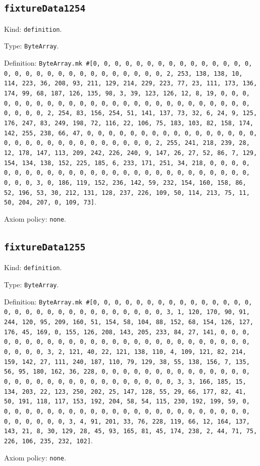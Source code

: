 \documentclass[11pt]{article}
\begin{document}
\subsection*{\texttt{fixtureData1254}}
\noindent Kind: \texttt{definition}.\par
\noindent Type: \texttt{ByteArray}.\par
\noindent Definition: \texttt{ByteArray.mk \#[0, 0, 0, 0, 0, 0, 0, 0, 0, 0, 0, 0, 0, 0, 0, 0, 0, 0, 0, 0, 0, 0, 0, 0, 0, 0, 0, 0, 0, 0, 2, 253, 138, 138, 10, 114, 223, 36, 208, 93, 211, 129, 214, 229, 223, 77, 23, 111, 173, 136, 174, 99, 68, 187, 126, 135, 98, 3, 39, 123, 126, 12, 8, 19, 0, 0, 0, 0, 0, 0, 0, 0, 0, 0, 0, 0, 0, 0, 0, 0, 0, 0, 0, 0, 0, 0, 0, 0, 0, 0, 0, 0, 0, 0, 2, 254, 83, 156, 254, 51, 141, 137, 73, 32, 6, 24, 9, 125, 176, 247, 83, 249, 198, 72, 116, 22, 106, 75, 183, 103, 82, 158, 174, 142, 255, 238, 66, 47, 0, 0, 0, 0, 0, 0, 0, 0, 0, 0, 0, 0, 0, 0, 0, 0, 0, 0, 0, 0, 0, 0, 0, 0, 0, 0, 0, 0, 0, 0, 2, 255, 241, 218, 239, 28, 12, 178, 147, 113, 209, 242, 226, 240, 9, 147, 26, 27, 52, 86, 7, 129, 154, 134, 138, 152, 225, 185, 6, 233, 171, 251, 34, 218, 0, 0, 0, 0, 0, 0, 0, 0, 0, 0, 0, 0, 0, 0, 0, 0, 0, 0, 0, 0, 0, 0, 0, 0, 0, 0, 0, 0, 0, 0, 3, 0, 186, 119, 152, 236, 142, 59, 232, 154, 160, 158, 86, 52, 196, 53, 30, 212, 131, 128, 237, 226, 109, 50, 114, 213, 75, 11, 50, 204, 207, 0, 109, 73]}.\par
\noindent Axiom policy: \texttt{none}.\par
\subsection*{\texttt{fixtureData1255}}
\noindent Kind: \texttt{definition}.\par
\noindent Type: \texttt{ByteArray}.\par
\noindent Definition: \texttt{ByteArray.mk \#[0, 0, 0, 0, 0, 0, 0, 0, 0, 0, 0, 0, 0, 0, 0, 0, 0, 0, 0, 0, 0, 0, 0, 0, 0, 0, 0, 0, 0, 0, 3, 1, 120, 170, 90, 91, 244, 120, 95, 209, 160, 51, 154, 58, 104, 88, 152, 68, 154, 126, 127, 176, 45, 169, 0, 155, 126, 208, 143, 205, 233, 84, 27, 141, 0, 0, 0, 0, 0, 0, 0, 0, 0, 0, 0, 0, 0, 0, 0, 0, 0, 0, 0, 0, 0, 0, 0, 0, 0, 0, 0, 0, 0, 0, 3, 2, 121, 40, 22, 121, 138, 110, 4, 109, 121, 82, 214, 159, 142, 27, 111, 240, 187, 110, 79, 129, 38, 55, 138, 156, 7, 135, 56, 95, 180, 162, 36, 228, 0, 0, 0, 0, 0, 0, 0, 0, 0, 0, 0, 0, 0, 0, 0, 0, 0, 0, 0, 0, 0, 0, 0, 0, 0, 0, 0, 0, 0, 0, 3, 3, 166, 185, 15, 134, 203, 22, 123, 250, 202, 25, 147, 128, 55, 29, 66, 177, 82, 41, 50, 191, 118, 117, 153, 192, 204, 58, 54, 115, 230, 192, 199, 59, 0, 0, 0, 0, 0, 0, 0, 0, 0, 0, 0, 0, 0, 0, 0, 0, 0, 0, 0, 0, 0, 0, 0, 0, 0, 0, 0, 0, 0, 0, 3, 4, 91, 201, 33, 76, 228, 119, 66, 12, 164, 137, 143, 21, 8, 30, 129, 28, 45, 93, 165, 81, 45, 174, 238, 2, 44, 71, 75, 226, 106, 235, 232, 102]}.\par
\noindent Axiom policy: \texttt{none}.\par
\end{document}

